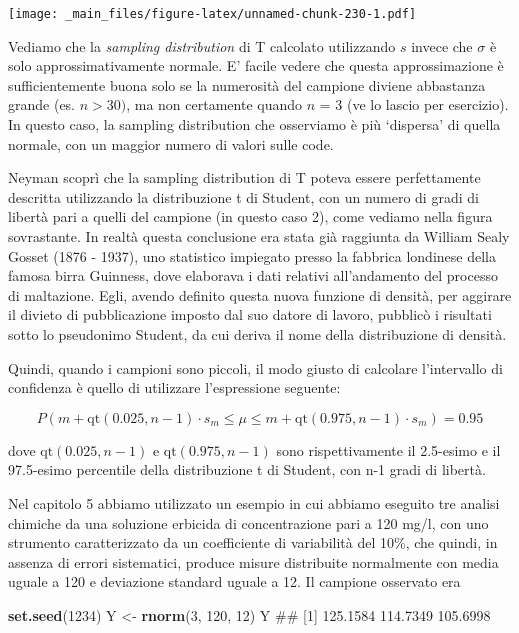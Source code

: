 \documentclass[a4paper,12pt,oneside]{book}
\newenvironment{Shaded}{\begin{snugshade}}{\end{snugshade}}
\newcommand{\KeywordTok}[1]{\textcolor[rgb]{0.13,0.29,0.53}{\textbf{#1}}}
\newcommand{\DecValTok}[1]{\textcolor[rgb]{0.00,0.00,0.81}{#1}}
\newcommand{\StringTok}[1]{\textcolor[rgb]{0.31,0.60,0.02}{#1}}
\newcommand{\NormalTok}[1]{#1}
\theoremstyle{definition}
\theoremstyle{definition}
\theoremstyle{definition}
\theoremstyle{remark}
\begin{document}
\texttt{[image: \_main\_files/figure-latex/unnamed-chunk-230-1.pdf]}

Vediamo che la \emph{sampling distribution} di T calcolato utilizzando
\(s\) invece che \(\sigma\) è solo approssimativamente normale. E'
facile vedere che questa approssimazione è sufficientemente buona solo
se la numerosità del campione diviene abbastanza grande (es.
\(n > 30)\), ma non certamente quando \(n\) = 3 (ve lo lascio per
esercizio). In questo caso, la sampling distribution che osserviamo è
più `dispersa' di quella normale, con un maggior numero di valori sulle
code.

Neyman scoprì che la sampling distribution di T poteva essere
perfettamente descritta utilizzando la distribuzione t di Student, con
un numero di gradi di libertà pari a quelli del campione (in questo caso
2), come vediamo nella figura sovrastante. In realtà questa conclusione
era stata già raggiunta da William Sealy Gosset (1876 - 1937), uno
statistico impiegato presso la fabbrica londinese della famosa birra
Guinness, dove elaborava i dati relativi all'andamento del processo di
maltazione. Egli, avendo definito questa nuova funzione di densità, per
aggirare il divieto di pubblicazione imposto dal suo datore di lavoro,
pubblicò i risultati sotto lo pseudonimo Student, da cui deriva il nome
della distribuzione di densità.

Quindi, quando i campioni sono piccoli, il modo giusto di calcolare
l'intervallo di confidenza è quello di utilizzare l'espressione
seguente:

\[P \left( m + \textrm{qt}(0.025,n - 1) \cdot s_m \le \mu  \le m + \textrm{qt}(0.975,n - 1) \cdot s_m \right) = 0.95\]

dove \(\textrm{qt}(0.025,n - 1)\) e \(\textrm{qt}(0.975,n - 1)\) sono
rispettivamente il 2.5-esimo e il 97.5-esimo percentile della
distribuzione t di Student, con n-1 gradi di libertà.

Nel capitolo 5 abbiamo utilizzato un esempio in cui abbiamo eseguito tre
analisi chimiche da una soluzione erbicida di concentrazione pari a 120
mg/l, con uno strumento caratterizzato da un coefficiente di variabilità
del 10\%, che quindi, in assenza di errori sistematici, produce misure
distribuite normalmente con media uguale a 120 e deviazione standard
uguale a 12. Il campione osservato era

\begin{Shaded}
\begin{Highlighting}[]
\KeywordTok{set.seed}\NormalTok{(}\DecValTok{1234}\NormalTok{)}
\NormalTok{Y <-}\StringTok{ }\KeywordTok{rnorm}\NormalTok{(}\DecValTok{3}\NormalTok{, }\DecValTok{120}\NormalTok{, }\DecValTok{12}\NormalTok{)}
\NormalTok{Y}
\NormalTok{## [1] 125.1584 114.7349 105.6998}
\end{Highlighting}
\end{Shaded}
\end{document}
